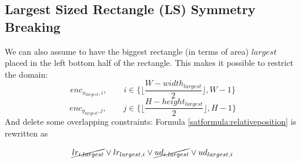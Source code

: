 \subsection{Largest Sized Rectangle (LS) Symmetry Breaking} 

We can also assume to have the biggest rectangle (in terms of area) $largest$ placed in the left bottom half of the rectangle. This makes it possible to restrict the domain:
$$enc_{x_{largest},i}, \qquad i \in \{ \lfloor \frac{W-width_{largest}}{2} \rfloor, W-1 \}$$
$$enc_{y_{largest},j}, \qquad j \in \{ \lfloor \frac{H-height_{largest}}{2} \rfloor, H-1 \}$$
And delete some overlapping constraints:
\newline
Formula \ref{satformula:relativeposition} is rewritten as

\begin{equation*}
    \cancel{lr_{i,largest}} \vee lr_{largest,i} \vee \cancel{ud_{i,largest}} \vee ud_{largest,i}
\end{equation*}

